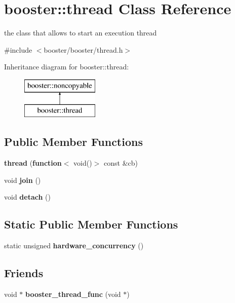 \section{booster\-:\-:thread Class Reference}
\label{classbooster_1_1thread}


the class that allows to start an execution thread  




{\ttfamily \#include $<$booster/booster/thread.\-h$>$}

Inheritance diagram for booster\-:\-:thread\-:\begin{figure}[H]
\begin{center}
\leavevmode
\includegraphics[height=2.000000cm]{classbooster_1_1thread}
\end{center}
\end{figure}
\subsection*{Public Member Functions}
\begin{DoxyCompactItemize}
\item 
{\bf thread} ({\bf function}$<$ void()$>$ const \&cb)
\item 
void {\bf join} ()
\item 
void {\bf detach} ()
\end{DoxyCompactItemize}
\subsection*{Static Public Member Functions}
\begin{DoxyCompactItemize}
\item 
static unsigned {\bf hardware\-\_\-concurrency} ()
\end{DoxyCompactItemize}
\subsection*{Friends}
\begin{DoxyCompactItemize}
\item 
void $\ast$ {\bfseries booster\-\_\-thread\-\_\-func} (void $\ast$)\label{classbooster_1_1thread_a43f901dbff4f76ecba6c6903170ac7c5}

\end{DoxyCompactItemize}


